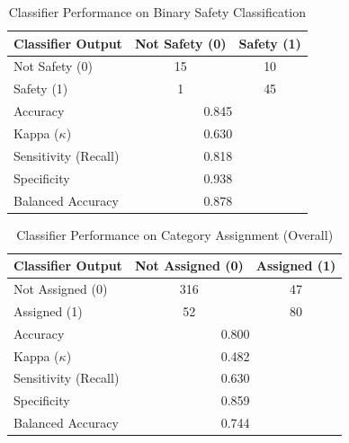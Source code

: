 \begin{table}[ht]
\centering
\caption{Classifier Performance on Binary Safety Classification}
\label{tab:cm-safety}
\begin{tabular}{lcc}
\hline
\textbf{Classifier Output} & \textbf{Not Safety (0)} & \textbf{Safety (1)} \\
\hline
Not Safety (0) & 15 & 10 \\
Safety (1) & 1 & 45 \\
\hline
Accuracy & \multicolumn{2}{c}{0.845} \\
Kappa ($\kappa$) & \multicolumn{2}{c}{0.630} \\
Sensitivity (Recall) & \multicolumn{2}{c}{0.818} \\
Specificity & \multicolumn{2}{c}{0.938} \\
Balanced Accuracy & \multicolumn{2}{c}{0.878} \\
\hline
\end{tabular}
\end{table}

\begin{table}[ht]
\centering
\caption{Classifier Performance on Category Assignment (Overall)}
\label{tab:cm-overall}
\begin{tabular}{lcc}
\hline
\textbf{Classifier Output} & \textbf{Not Assigned (0)} & \textbf{Assigned (1)} \\
\hline
Not Assigned (0) & 316 & 47 \\
Assigned (1) & 52 & 80 \\
\hline
Accuracy & \multicolumn{2}{c}{0.800} \\
Kappa ($\kappa$) & \multicolumn{2}{c}{0.482} \\
Sensitivity (Recall) & \multicolumn{2}{c}{0.630} \\
Specificity & \multicolumn{2}{c}{0.859} \\
Balanced Accuracy & \multicolumn{2}{c}{0.744} \\
\hline
\end{tabular}
\end{table}

